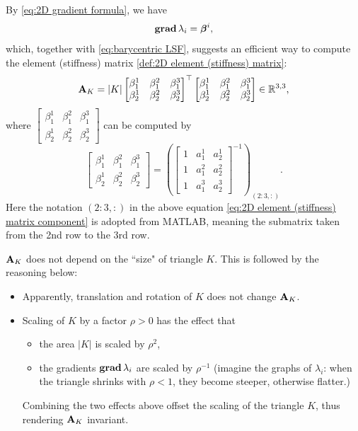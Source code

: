 	By \eqref{eq:2D gradient formula}, we have
	\begin{equation}
		\mathbf{grad}\, \lambda_i = \bm{\beta}^i,
	\end{equation}
	which, together with \eqref{eq:barycentric LSF}, suggests an efficient 
	way to compute the element (stiffness) matrix 
	\eqref{def:2D element (stiffness) matrix}:
	\begin{equation}\label{eq:2D element (stiffness) matrix formula}
		\mathbf{A}_K=|K|
		\begin{bmatrix}
			\beta^1_1 &\beta^2_1 &\beta^3_1\\
			\beta^1_2 &\beta^2_2 &\beta^3_2			
		\end{bmatrix}^\top
		\begin{bmatrix}
			\beta^1_1 &\beta^2_1 &\beta^3_1\\
			\beta^1_2 &\beta^2_2 &\beta^3_2			
		\end{bmatrix}\in\mathbb{R}^{3,3},
	\end{equation}
	where $
	\begin{bmatrix}
		\beta^1_1 &\beta^2_1 &\beta^3_1\\
		\beta^1_2 &\beta^2_2 &\beta^3_2			
	\end{bmatrix}$
	can be computed by
	\begin{equation}\label{eq:2D element (stiffness) matrix component}
		\begin{bmatrix}
			\beta^1_1 &\beta^2_1 &\beta^3_1\\
			\beta^1_2 &\beta^2_2 &\beta^3_2			
		\end{bmatrix}=
		\left(\begin{bmatrix}
			1 &a^1_1 &a^1_2\\
			1 &a^2_1 &a^2_2\\
			1 &a^3_1 &a^3_2
		\end{bmatrix}^{-1}\right)_{(2:3,:)}.
	\end{equation}
	Here the notation $(2:3,:)$ in the above equation 
	\eqref{eq:2D element (stiffness) matrix component} is adopted from
	MATLAB, meaning the submatrix taken from the 2nd row to the 3rd row.
	
	\begin{remark}
	$\mathbf{A}_K$ does not depend on the ``size" of triangle $K$.
	This is	followed by the reasoning below:
	\begin{itemize}
		\item Apparently, translation and rotation of $K$ does not
			change $\mathbf{A}_K$.
		\item Scaling of $K$ by a factor $\rho>0$ has the effect that
		\begin{itemize}
			\item the area $|K|$ is scaled by $\rho^2$,
			\item the gradients $\mathbf{grad}\, \lambda_i$ are scaled by $\rho^{-1}$
				(imagine the graphs of $\lambda_i$: when the triangle shrinks 
				with $\rho<1$, they become steeper, otherwise flatter.)
		\end{itemize}
		Combining the two effects above offset the scaling of the
		triangle $K$, thus rendering $\mathbf{A}_K$ invariant.			
	\end{itemize}
	\end{remark}\vspace{8pt}
	
